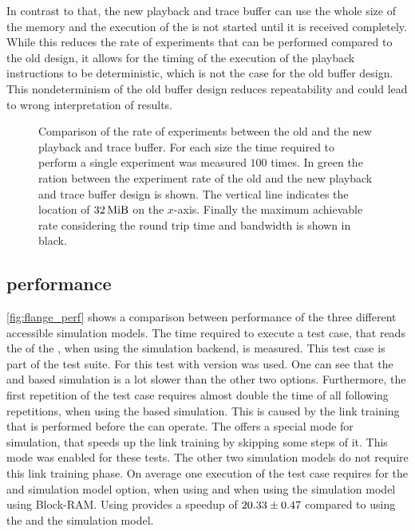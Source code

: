 In contrast to that, the new playback and trace buffer can use the whole size of the \DDR{} memory and the execution of the \PlaybackProgram{} is not started until it is received completely. While this reduces the rate of experiments that can be performed compared to the old design, it allows for the timing of the execution of the playback instructions to be deterministic, which is not the case for the old buffer design. This nondeterminism of the old buffer design reduces repeatability and could lead to wrong interpretation of results.

\begin{figure}
\caption{Comparison of the rate of experiments between the old and the new playback and trace buffer. For each size the time required to perform a single experiment was measured $\num{100}$ times. In green the ration between the experiment rate of the old and the new playback and trace buffer design is shown. The vertical line indicates the location of $\SI{32}{\mebi\byte}$ on the $x$-axis. Finally the maximum achievable rate considering the round trip time and \HostARQ{} bandwidth is shown in black.}\label{fig:experimentrate}
\end{figure}

\subsection{\flangedram{} performance}
\autoref{fig:flange_perf} shows a comparison between performance of the three different \AXI{} accessible \DRAM{} simulation models. The time required to execute a test case, that reads the \JTAGID{} of the \ASIC{}, when using the \hxcomm{} simulation backend, is measured. This test case is part of the \hxcomm{} test suite. For this test \xcelium{} with version \xceliumVer{} was used. One can see that the \XilinxMIG{} and \DDR{} based simulation is a lot slower than the other two options. Furthermore, the first repetition of the test case requires almost double the time of all following repetitions, when using the \XilinxMIG{} based simulation. This is caused by the link training that is performed before the \XilinxMIG{} can operate. The \XilinxMIG{} offers a special mode for simulation, that speeds up the link training by skipping some steps of it. This mode was enabled for these tests. The other two simulation models do not require this link training phase. On average one execution of the test case requires  for the \XilinxMIG{} and \DDR{} simulation model option,  when using \flangedram{} and  when using the simulation model using Block-RAM. Using \flangedram{} provides a speedup of $\num{20.331950+-0.47378}$ compared to using the \XilinxMIG{} and the \DDR{} simulation model.

